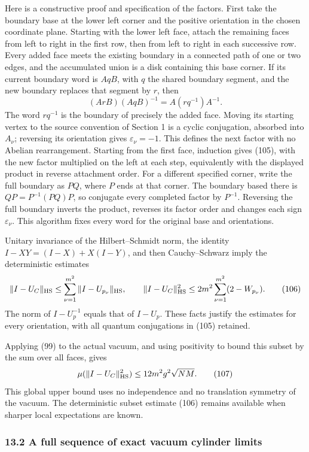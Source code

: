 \documentclass[
  11pt,
]{article}
\begin{document}
Here is a constructive proof and specification of the factors. First
take the boundary base at the lower left corner and the positive
orientation in the chosen coordinate plane. Starting with the lower left
face, attach the remaining faces from left to right in the first row,
then from left to right in each successive row. Every added face meets
the existing boundary in a connected path of one or two edges, and the
accumulated union is a disk containing this base corner. If its current
boundary word is \(AqB\), with \(q\) the shared boundary segment, and
the new boundary replaces that segment by \(r\), then \[
 (ArB)(AqB)^{-1}=A(rq^{-1})A^{-1}.
\] The word \(rq^{-1}\) is the boundary of precisely the added face.
Moving its starting vertex to the source convention of Section 1 is a
cyclic conjugation, absorbed into \(A_\nu\); reversing its orientation
gives \(\varepsilon_\nu=-1\). This defines the next factor with no
Abelian rearrangement. Starting from the first face, induction gives
(105), with the new factor multiplied on the left at each step,
equivalently with the displayed product in reverse attachment order. For
a different specified corner, write the full boundary as \(PQ\), where
\(P\) ends at that corner. The boundary based there is
\(QP=P^{-1}(PQ)P\), so conjugate every completed factor by \(P^{-1}\).
Reversing the full boundary inverts the product, reverses its factor
order and changes each sign \(\varepsilon_\nu\). This algorithm fixes
every word for the original base and orientations.

Unitary invariance of the Hilbert--Schmidt norm, the identity
\(I-XY=(I-X)+X(I-Y)\), and then Cauchy--Schwarz imply the deterministic
estimates \[
 \|I-U_C\|_{\rm HS}
 \le\sum_{\nu=1}^{m^2}\|I-U_{p_\nu}\|_{\rm HS},\qquad
 \|I-U_C\|_{\rm HS}^2
 \le2m^2\sum_{\nu=1}^{m^2}(2-W_{p_\nu}).
 \tag{106}
\] The norm of \(I-U_p^{-1}\) equals that of \(I-U_p\). These facts
justify the estimates for every orientation, with all quantum
conjugations in (105) retained.

Applying (99) to the actual vacuum, and using positivity to bound this
subset by the sum over all faces, gives \[
 \mu(\|I-U_C\|_{\rm HS}^2)
 \le12m^2g^2\sqrt{NM}.
 \tag{107}
\] This global upper bound uses no independence and no translation
symmetry of the vacuum. The deterministic subset estimate (106) remains
available when sharper local expectations are known.

\subsubsection{13.2 A full sequence of exact vacuum cylinder
limits}\label{a-full-sequence-of-exact-vacuum-cylinder-limits}
\end{document}
